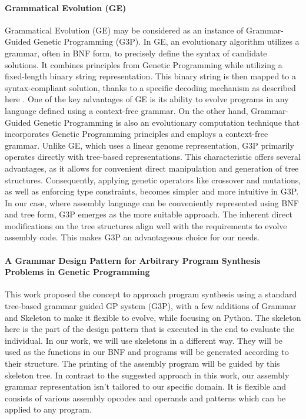 \documentclass[dvipsnames,format=sigconf,anonymous=true,review=true]{acmart}
\begin{document}
\paragraph{Grammatical Evolution (GE)}
Grammatical Evolution (GE) may be considered as an instance of Grammar-Guided Genetic Programming (G3P). In GE, an evolutionary algorithm utilizes a grammar, often in BNF form, to precisely define the syntax of candidate solutions. It combines principles from Genetic Programming while utilizing a fixed-length binary string representation. This binary string is then mapped to a syntax-compliant solution, thanks to a specific decoding mechanism as described here \cite{ONeil2004piGE}. One of the key advantages of GE is its ability to evolve programs in any language defined using a context-free grammar. On the other hand, Grammar-Guided Genetic Programming is also an evolutionary computation technique that incorporates Genetic Programming principles and employs a context-free grammar. Unlike GE, which uses a linear genome representation, G3P primarily operates directly with tree-based representations. This characteristic offers several advantages, as it allows for convenient direct manipulation and generation of tree structures. Consequently, applying genetic operators like crossover and mutations, as well as enforcing type constraints, becomes simpler and more intuitive in G3P. In our case, where assembly language can be conveniently represented using BNF and tree form, G3P emerges as the more suitable approach. The inherent direct modifications on the tree structures align well with the requirements to evolve assembly code. This makes G3P an advantageous choice for our needs.

\paragraph{A Grammar Design Pattern for Arbitrary Program Synthesis Problems in Genetic Programming} This work \cite{Forstenlechner2017Grammar} proposed the concept to approach program synthesis using a standard tree-based grammar guided GP system (G3P), with a few additions of Grammar and Skeleton to make it flexible to evolve, while focusing on Python. The skeleton here is the part of the design pattern that is executed in the end to evaluate the individual.
In our work, we will use skeletons in a different way. They will be used as the functions in our BNF and programs will be generated according to their structure. The printing of the assembly program will be guided by this skeleton tree. In contrast to the suggested approach in this work, our assembly grammar representation isn't tailored to our specific domain. It is flexible and consists of various assembly opcodes and operands and patterns which can be applied to any program.
\end{document}
